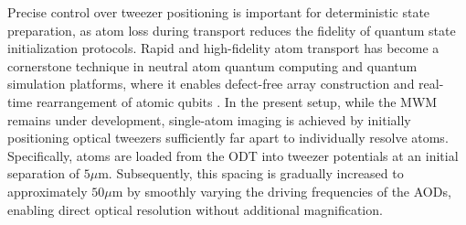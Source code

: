 


Precise control over tweezer positioning is important for deterministic state preparation, as atom loss during transport reduces the fidelity of quantum state initialization protocols. Rapid and high-fidelity atom transport has become a cornerstone technique in neutral atom quantum computing and quantum simulation platforms, where it enables defect-free array construction and real-time rearrangement of atomic qubits \cite{barredo_atom-by-atom_2016}. In the present setup, while the MWM remains under development, single-atom imaging is achieved by initially positioning optical tweezers sufficiently far apart to individually resolve atoms. Specifically, atoms are loaded from the ODT into tweezer potentials at an initial separation of $5\mu$m. Subsequently, this spacing is gradually increased to approximately $50\mu$m by smoothly varying the driving frequencies of the AODs, enabling direct optical resolution without additional magnification.



